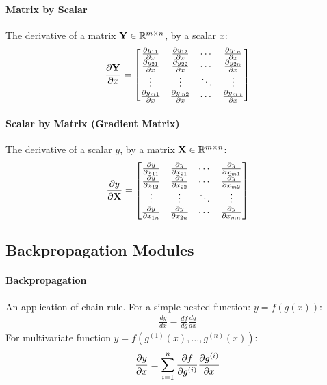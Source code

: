 \paragraph{Matrix by Scalar}

The derivative of a matrix $\mathbf{Y}\in\mathbb{R}^{m\times n}$, by a scalar $x$:
\begin{align*}
	\frac{\partial\mathbf{Y}}{\partial x}=\begin{bmatrix}
	\frac{\partial y_{11}}{\partial x}&\frac{\partial y_{12}}{\partial x}&\cdots&\frac{\partial y_{1n}}{\partial x} \\
	\frac{\partial y_{21}}{\partial x}&\frac{\partial y_{22}}{\partial x}&\cdots&\frac{\partial y_{2n}}{\partial x} \\
	\vdots&\vdots&\ddots&\vdots \\
	\frac{\partial y_{m1}}{\partial x}&\frac{\partial y_{m2}}{\partial x}&\cdots&\frac{\partial y_{mn}}{\partial x}
\end{bmatrix}
\end{align*}

\paragraph{Scalar by Matrix (Gradient Matrix)}

The derivative of a scalar $y$, by a matrix $\mathbf{X}\in\mathbb{R}^{m\times n}$:
\begin{align*}
	\frac{\partial y}{\partial\mathbf{X}}=\begin{bmatrix}
	\frac{\partial y}{\partial x_{11}}&\frac{\partial y}{\partial x_{21}}&\cdots&\frac{\partial y}{\partial x_{m1}} \\
	\frac{\partial y}{\partial x_{12}}&\frac{\partial y}{\partial x_{22}}&\cdots&\frac{\partial y}{\partial x_{m2}} \\
	\vdots&\vdots&\ddots&\vdots \\
	\frac{\partial y}{\partial x_{1n}}&\frac{\partial y}{\partial x_{2n}}&\cdots&\frac{\partial y}{\partial x_{mn}}
\end{bmatrix}
\end{align*}

\subsection{Backpropagation Modules}

\paragraph{Backpropagation}

An application of chain rule. For a simple nested function: $y=f(g(x))$:
\begin{align*}
	\frac{dy}{dx}=\frac{df}{dg}\frac{dg}{dx}
\end{align*}
For multivariate function $y=f\left(g^{(1)}(x),\dotsc,g^{(n)}(x)\right)$:
\begin{align*}
	\frac{\partial y}{\partial x}=\sum_{i=1}^n\frac{\partial f}{\partial g^{(i)}}\frac{\partial g^{(i)}}{\partial x}
\end{align*}

